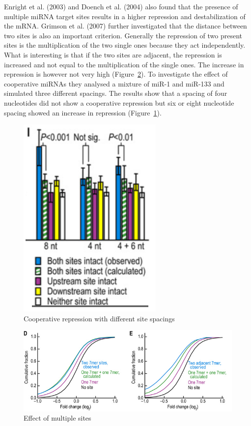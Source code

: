 \documentclass[11pt,  a4paper]{report}
\begin{document}
Enright et al. (2003) and Doench et al. (2004) also found that the presence of multiple miRNA target sites results in a higher repression and destabilization of the mRNA. Grimson et al. (2007) further investigated that the distance between two sites is also an important criterion. Generally the repression of two present sites is the multiplication of the two single ones because they act independently. What is interesting is that if the two sites are adjacent, the repression is increased and not equal to the multiplication of the single ones. The increase in repression is however not very high (Figure~\ref{sitedistance}). To investigate the effect of cooperative miRNAs they analysed a mixture of miR-1 and miR-133 and simulated three different spacings. The results show that a spacing of four nucleotides did not show a cooperative repression but six or eight nucleotide spacing showed an increase in repression (Figure~\ref{sitespacing}). \\


\begin{figure}[h]
\centering
\includegraphics[scale=0.6]{results/sites_8nt.PNG}  
\caption{Cooperative repression with different site spacings}
\label{sitespacing}
\end{figure}

\begin{figure}[h]
\centering
\includegraphics[scale=0.65]{results/sites_distance.PNG}
\caption{Effect of multiple sites}
\label{sitedistance}
\end{figure}
\end{document}
